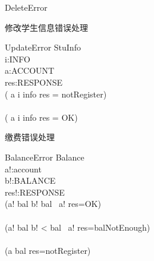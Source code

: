\documentclass{article}
\begin{document}
\begin{CJK}{UTF8}{gbsn}
\begin{spacing}{1.4}
\begin{schema}{DeleteError}
\end{schema}
修改学生信息错误处理

\begin{schema}{UpdateError}
\Xi StuInfo\\
i:INFO\\
a:ACCOUNT\\
res:RESPONSE\\
\where
( a \mapsto i \notin info \land res = notRegister)\\
\lor\\
( a \mapsto i \in info  \land res = OK)\\

\end{schema}

缴费错误处理
\begin{schema}{BalanceError}
\Xi Balance\\
a!:account\\
b!:BALANCE\\
res!:RESPONSE\\
\where
(a! \in bal \land b! \geq bal \ a! \land res=OK)\\
\lor\\
(a! \in bal \land b! < bal \ a! \land res=balNotEnough)\\
\lor\\
(a \notin bal  \land res=notRegister)\\
\end{schema}


\end{spacing}
\end{CJK}
\end{document}
